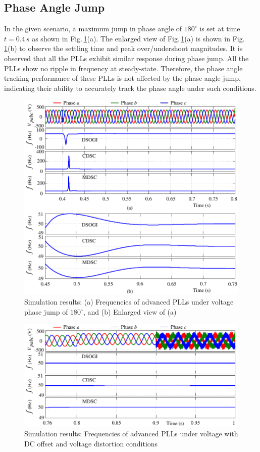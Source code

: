 \subsection{Phase Angle Jump}
In the given scenario, a maximum jump in phase angle of $180^\circ$ is set at time $t=0.4\,\si{s}$ as shown in Fig.\,\ref{fig3.9(7)}(a). The enlarged view of Fig.\,\ref{fig3.9(7)}(a) is shown in Fig.\,\ref{fig3.9(7)}(b) to observe the settling time and peak over/undershoot magnitudes. It is observed that all the PLLs exhibit similar response during phase jump. All the PLLs show no ripple in frequency at steady-state. Therefore, the phase angle tracking performance of these PLLs is not affected by the phase angle jump, indicating their ability to accurately track the phase angle under such conditions.
\begin{figure}[] 
	\centering
	\includegraphics[scale=1]{figures/Chapter_3/Mine/SimRes7_new.pdf}
	\caption{Simulation results: (a) Frequencies of advanced PLLs under voltage phase jump of $180^\circ$, and (b) Enlarged view of (a) }
	\label{fig3.9(7)}
\end{figure}
\begin{figure}[] 
	\centering
	\includegraphics[scale=1]{figures/Chapter_3/Mine/SimRes8_new.pdf}
	\caption{Simulation results: Frequencies of advanced PLLs under voltage with DC offset and voltage distortion conditions}
	\label{fig3.9(8)}
\end{figure}  
